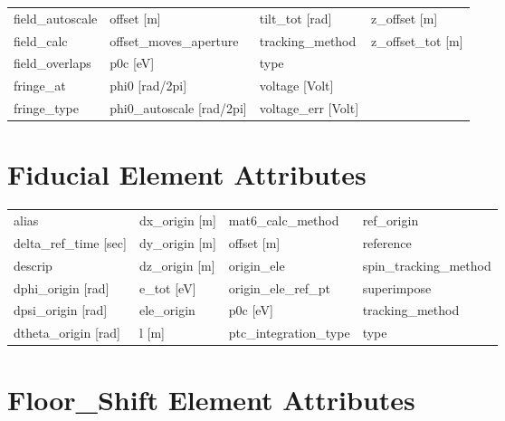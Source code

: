 \begin{tabular}{llll}
field_autoscale                & offset [m]                     & tilt_tot [rad]                 & z_offset [m]                   \\
field_calc                     & offset_moves_aperture          & tracking_method                & z_offset_tot [m]               \\
field_overlaps                 & p0c [eV]                       & type                           &                                \\
fringe_at                      & phi0 [rad/2pi]                 & voltage [Volt]                 &                                \\
fringe_type                    & phi0_autoscale [rad/2pi]       & voltage_err [Volt]             &                                \\
 \bottomrule
 \end{tabular}
 \vfill
 
 \section{Fiducial Element Attributes}
 \label{s:list.fiducial}
 
 \begin{tabular}{llll} \toprule
alias                          & dx_origin [m]                  & mat6_calc_method               & ref_origin                     \\
delta_ref_time [sec]           & dy_origin [m]                  & offset [m]                     & reference                      \\
descrip                        & dz_origin [m]                  & origin_ele                     & spin_tracking_method           \\
dphi_origin [rad]              & e_tot [eV]                     & origin_ele_ref_pt              & superimpose                    \\
dpsi_origin [rad]              & ele_origin                     & p0c [eV]                       & tracking_method                \\
dtheta_origin [rad]            & l [m]                          & ptc_integration_type           & type                           \\
 \bottomrule
 \end{tabular}
 \vfill
 
 \section{Floor_Shift Element Attributes}
 \label{s:list.floor.shift}
 
